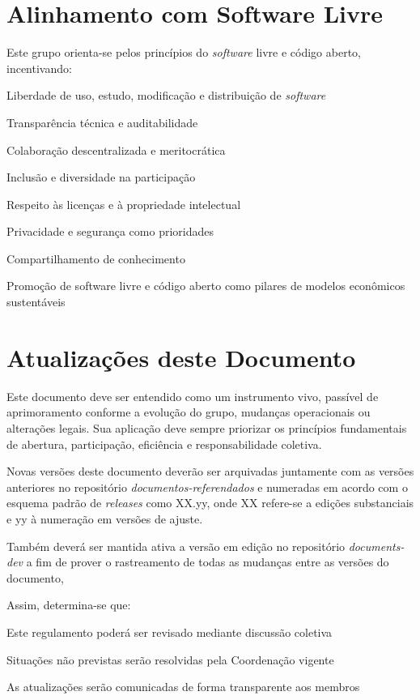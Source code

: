 \documentclass[
  12pt,          %
  a4paper,       %
  oneside,       %
  brazil         %
]{article}
\begin{document}
\section{Alinhamento com Software Livre}

Este grupo orienta-se pelos princípios do \textit{software} livre e código aberto, incentivando:

\begin{conduta}
  \item Liberdade de uso, estudo, modificação e distribuição de \textit{software}
  \item Transparência técnica e auditabilidade
  \item Colaboração descentralizada e meritocrática
  \item Inclusão e diversidade na participação 
  \item Respeito às licenças e à propriedade intelectual 
  \item Privacidade e segurança como prioridades 
  \item Compartilhamento de conhecimento
  \item Promoção de software livre e código aberto como pilares de modelos econômicos sustentáveis
\end{conduta}

\section{Atualizações deste Documento}

Este documento deve ser entendido como um instrumento vivo, passível de aprimoramento conforme a evolução do grupo, mudanças operacionais ou alterações legais. 
Sua aplicação deve sempre priorizar os princípios fundamentais de abertura, participação, eficiência e responsabilidade coletiva.

Novas versões deste documento deverão ser arquivadas juntamente com as versões anteriores no repositório \textit{documentos-referendados} e numeradas em acordo
 com o esquema padrão de \textit{releases} como XX.yy, onde XX refere-se a edições substanciais e yy à numeração em versões de ajuste. 
 
Também deverá ser mantida ativa a versão em edição no repositório \textit{documents-dev} a fim de prover o rastreamento de todas as mudanças entre as versões do documento,

Assim, determina-se que:
\begin{conduta}
	\item Este regulamento poderá ser revisado mediante discussão coletiva
	\item Situações não previstas serão resolvidas pela Coordenação vigente
	\item As atualizações serão comunicadas de forma transparente aos membros
\end{conduta}

\vspace{2cm}

\end{document}

